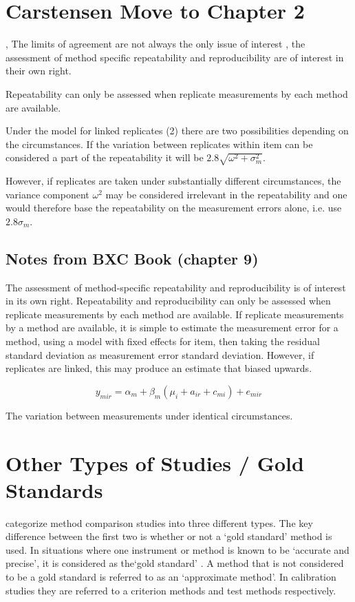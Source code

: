 \documentclass[12pt, a4paper]{report}
\theoremstyle{plain}
\theoremstyle{definition}
\theoremstyle{remark}
\begin{document}
		
		
	\section{Carstensen Move to Chapter 2}
, The limits of agreement are not always the only issue of
		interest , the assessment of method specific repeatability and
		reproducibility are of interest in their own right.
		
 Repeatability can only be assessed when replicate
		measurements by each method are available.

 Under the model for linked replicates (2) there are two
		possibilities depending on the circumstances.
If the variation between replicates within item can be
		considered a part of the repeatability it will be $2.8 \sqrt{
			\omega^2 + \sigma^2_m}$.

 However, if replicates are taken under substantially
		different circumstances, the variance component $\omega^2$ may be
		considered irrelevant in the repeatability and one would therefore
		base the repeatability on the measurement errors alone, i.e. use
		$2.8 \sigma_m$.


	\subsection{Notes from BXC Book (chapter 9)}
	The assessment of method-specific repeatability and reproducibility is of interest in its own right.
	Repeatability and reproducibility can only be assessed when replicate measurements by each method are available.
	If replicate measurements by a method are available, it is simple to estimate the measurement error for a method, using a model with fixed effects for item, then taking the residual standard deviation as measurement error standard deviation.
	However, if replicates are linked, this may produce an estimate that biased upwards.
	
	
	\[y_{mir}  = \alpha_{m} + \beta_m( \mu_i + a_{ir} + c_{mi}) + e_{mir}\]
	
	The variation between measurements under identical circumstances.
	

	
	



	\section{Other Types of Studies / Gold Standards}
	\citet{lewis} categorize method comparison studies into three
	different types.  The key difference between the first two is
	whether or not a `gold standard' method is used. In situations
	where one instrument or method is known to be `accurate and
	precise', it is considered as the`gold standard' \citep{lewis}. A
	method that is not considered to be a gold standard is referred to
	as an `approximate method'. In calibration studies they are
	referred to a criterion methods and test methods respectively.
	
\end{document}
